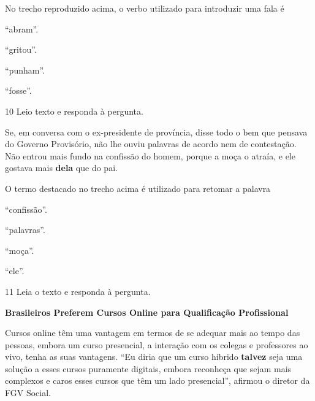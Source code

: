 No trecho reproduzido acima, o verbo utilizado para introduzir uma fala
é

\begin{multicols}{2}
\begin{escolha}
  \item ``abram''.

  \item ``gritou''.

  \item ``punham''.

  \item ``fosse''.
\end{escolha}
\end{multicols}

\num{10} Leio texto e responda à pergunta.

\begin{myquote}
Se, em conversa com o ex-presidente de província, disse todo o bem que
pensava do Governo Provisório, não lhe ouviu palavras de acordo nem de
contestação. Não entrou mais fundo na confissão do homem, porque a moça
o atraía, e ele gostava mais \textbf{dela} que do pai.

\end{myquote}

\pagebreak
O termo destacado no trecho acima é utilizado para retomar a palavra

\begin{multicols}{2}
\begin{escolha}
  \item ``confissão''.

  \item ``palavras''.

  \item ``moça''.

  \item ``ele''.
\end{escolha}
\end{multicols}

\num{11} Leia o texto e responda à pergunta.

\begin{myquote}
\textbf{Brasileiros Preferem Cursos Online para Qualificação Profissional}

Cursos online têm uma vantagem em termos de se adequar mais ao tempo das
pessoas, embora um curso presencial, a interação com os colegas e
professores ao vivo, tenha as suas vantagens. ``Eu diria que um curso
híbrido \textbf{talvez} seja uma solução a esses cursos puramente digitais,
embora reconheça que sejam mais complexos e caros esses cursos que têm
um lado presencial'', afirmou o diretor da FGV Social.

\end{myquote}

